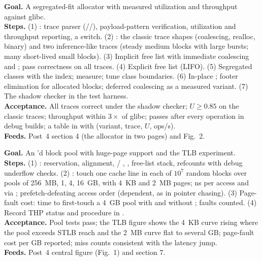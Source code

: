 \textbf{Goal.} A segregated-fit allocator with measured utilization and throughput against glibc.\\
\textbf{Steps.} (1) : trace parser (//), payload-pattern verification, utilization and throughput reporting, a  switch. (2) : the classic trace shapes (coalescing, realloc, binary) and two inference-like traces (steady medium blocks with large bursts; many short-lived small blocks). (3) Implicit free list with immediate coalescing and ; pass correctness on all traces. (4) Explicit free list (LIFO). (5) Segregated classes with the  index; measure; tune class boundaries. (6) In-place ; footer elimination for allocated blocks; deferred coalescing as a measured variant. (7) The shadow checker in the test harness.\\
\textbf{Acceptance.} All traces correct under the shadow checker; $U \ge 0.85$ on the classic traces; throughput within $3\times$ of glibc;  passes after every operation in debug builds; a table in  with (variant, trace, $U$, ops/s).\\
\textbf{Feeds.} Post~4 section 4 (the allocator in two pages) and Fig.~2.

\textbf{Goal.} An 'd block pool with huge-page support and the TLB experiment.\\
\textbf{Steps.} (1) : reservation, alignment,  / , , free-list stack, refcounts with debug underflow checks. (2) : touch one cache line in each of $10^7$ random blocks over pools of 256~MB, 1, 4, 16~GB, with 4~KB and 2~MB pages; ns per access and  via ; prefetch-defeating access order (dependent, as in pointer chasing). (3) Page-fault cost: time to first-touch a 4~GB pool with and without ; faults counted. (4) Record THP status and  procedure in .\\
\textbf{Acceptance.} Pool tests pass; the TLB figure shows the 4~KB curve rising where the pool exceeds STLB reach and the 2~MB curve flat to several GB; page-fault cost per GB reported; miss counts consistent with the latency jump.\\
\textbf{Feeds.} Post~4 central figure (Fig.~1) and section 7.

